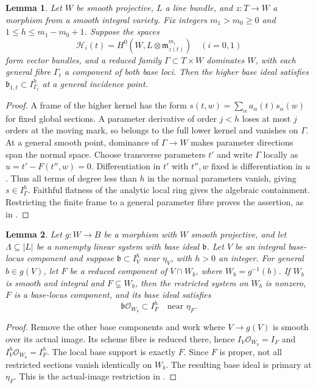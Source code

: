 \documentclass[12pt,a4paper,psamsfonts]{amsart}
\theoremstyle{definition}
\theoremstyle{plain}
\newtheorem{lemma}{Lemma}[section]
\newcommand{\OO}{\mathcal O}
\begin{document}
\begin{lemma}\label{lem:jet-normal-containment}
Let $W$ be smooth projective, $L$ a line bundle, and $z:T\to W$
a morphism from a smooth integral variety. Fix integers
$m_1>m_0\ge0$ and $1\le h\le m_1-m_0+1$.
Suppose the spaces
\[
 \mathcal H_i(t)=H^0(W,L\otimes\mathfrak m_{z(t)}^{m_i})
 \quad(i=0,1)
\]
form vector bundles, and a reduced family $\Gamma\subset T\times W$
dominates $W$, with each general fibre $\Gamma_t$ a component of
both base loci. Then the higher base ideal satisfies
$\mathfrak b_{1,t}\subset I_{\Gamma_t}^{h}$ at a general incidence point.
\end{lemma}
\begin{proof}
A frame of the higher kernel has the form
$s(t,w)=\sum_\alpha a_\alpha(t)s_\alpha(w)$ for fixed global sections.
A parameter derivative of order $j<h$ loses at most $j$ orders
at the moving mark, so belongs to the full lower kernel and
vanishes on $\Gamma$.
At a general smooth point, dominance of $\Gamma\to W$ makes
parameter directions span the normal space. Choose transverse
parameters $t'$ and write $\Gamma$ locally as
$u=t'-F(t'',w)=0$. Differentiation in $t'$ with $t'',w$ fixed
is differentiation in $u$. Thus all terms of degree less than $h$
in the normal parameters vanish, giving $s\in I_\Gamma^h$.
Faithful flatness of the analytic local ring gives the algebraic containment. Restricting the finite frame
to a general parameter fibre proves the assertion, as in
\cite[Lemma~7.3]{LA}.
\end{proof}

\begin{lemma}\label{lem:restricted-components}
Let $g:W\to B$ be a morphism with $W$ smooth projective, and let
$\Lambda\subseteq|L|$ be a nonempty linear system with base ideal
$\mathfrak b$. Let $V$ be an integral base-locus component and
suppose $\mathfrak b\subset I_V^h$ near $\eta_V$, with $h>0$ an integer.
For general $b\in g(V)$, let $F$ be a reduced component of $V\cap W_b$,
where $W_b=g^{-1}(b)$. If $W_b$ is smooth and integral and
$F\subsetneq W_b$, then the restricted system on $W_b$ is nonzero,
$F$ is a base-locus component, and its base ideal satisfies
\[
 \mathfrak b\mathcal O_{W_b}\subset I_F^h
 \quad\text{near }\eta_F.
\]
\end{lemma}
\begin{proof}
Remove the other base components and work where $V\to g(V)$ is
smooth over its actual image. Its scheme fibre is reduced there,
hence $I_V\OO_{W_b}=I_F$ and $I_V^h\OO_{W_b}=I_F^h$.
The local base support is exactly $F$.
Since $F$ is proper, not all restricted sections vanish identically
on $W_b$. The resulting base ideal is primary at $\eta_F$.
This is the actual-image restriction in \cite[Lemma~7.4]{LA}.
\end{proof}
\end{document}
